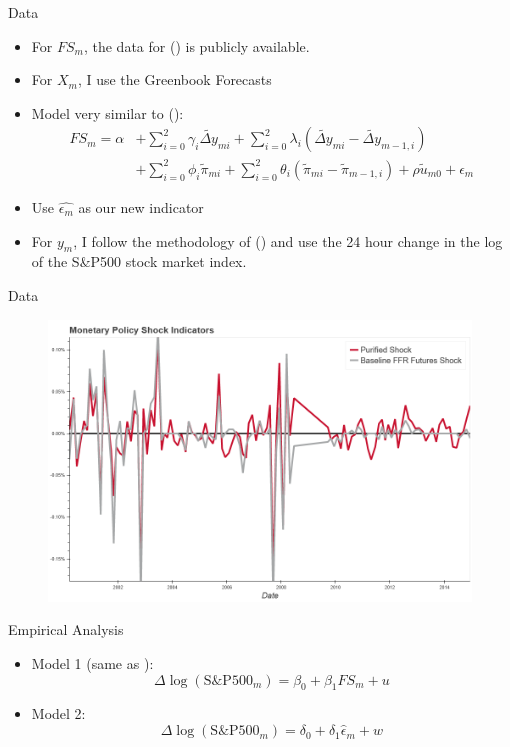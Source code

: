 \documentclass[xcolor=dvipsnames, compress, t]{beamer}
\begin{document}
	\begin{frame}{Data}
		\begin{itemize}
			\item<2-> For \(FS_m\), the data for \citeauthor{Nakamura2018} (\citeyear{Nakamura2018}) is publicly available.
			\item<3-> For \(X_m\), I use the Greenbook Forecasts
			\item<4-> Model very similar to \citeauthor{Romer2004} (\citeyear{Romer2004}):
			\begin{align*}
				FS_m =  \alpha &+ \sum_{i=0}^{2} \gamma_i \widetilde{\Delta y}_{mi} + \sum^2_{i=0} \lambda_i \left(\widetilde{\Delta y}_{mi}-\widetilde{\Delta y}_{m-1,i}\right)\\
				&+\sum^{2}_{i=0} \phi_i \tilde{\pi}_{mi} + \sum^2_{i=0} \theta_i \left(\tilde{ \pi}_{mi}-\tilde{ \pi}_{m-1,i}\right) + \rho \tilde{u}_{m0} + \epsilon_m
			\end{align*}
			\item<5-> Use \(\hat{\epsilon_m}\) as our new indicator
			\item<6-> For \(y_m\), I follow the methodology of \citeauthor{Bauer2020} (\citeyear{Bauer2020}) and use the 24 hour change in the log of the S\&P500 stock market index. 
		\end{itemize}
	\end{frame}
	\begin{frame}{Data}
		\begin{figure}
			\includegraphics[width=.90\textwidth]{charts/pure_indicator.png}
		\end{figure}
	\end{frame}
	\begin{frame}{Empirical Analysis}
		\begin{itemize} 
			\item<2-> Model 1 (same as \cite{Bauer2020}):
				\[
					\Delta \log{(\text{S\&P500}_m)} = \beta_0 + \beta_1 FS_m + u 
				\]
			\item<3-> Model 2: 
				\[
					\Delta \log{(\text{S\&P500}_m)} = \delta_0 + \delta_1 \hat{\epsilon}_m + w
				\]
		\end{itemize}
	\end{frame}
\end{document}
